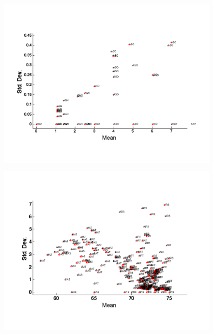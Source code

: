 \begin{figure}[t!] %
\centering
\includegraphics[width=1.0\columnwidth]{figs/ASOvsAGN}
\caption{}
\label{fig:asovsagn}
\end{figure}

\begin{figure}[t!] %
\centering
\includegraphics[width=1.0\columnwidth]{figs/temperature_streams}
\caption{}
\label{fig:tstreams}
\end{figure}


